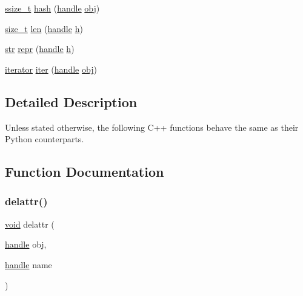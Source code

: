 \begin{DoxyCompactItemize}
\item 
\mbox{\hyperlink{detail_2common_8h_ac430d16fc097b3bf0a7469cfd09decda}{ssize\+\_\+t}} \mbox{\hyperlink{group__python__builtins_ga117a7eab72791313448c40a2f25f3582}{hash}} (\mbox{\hyperlink{classhandle}{handle}} \mbox{\hyperlink{_s_d_l__opengl__glext_8h_a0c0d4701a6c89f4f7f0640715d27ab26}{obj}})
\item 
\mbox{\hyperlink{detail_2common_8h_a801d6a451a01953ef8cbae6feb6a3638}{size\+\_\+t}} \mbox{\hyperlink{group__python__builtins_gaeff368081ac50b8fe2cc0230d96e3acb}{len}} (\mbox{\hyperlink{classhandle}{handle}} \mbox{\hyperlink{_s_d_l__opengl__glext_8h_afa0fb1b5e976920c0abeff2dca3ed774}{h}})
\item 
\mbox{\hyperlink{classstr}{str}} \mbox{\hyperlink{group__python__builtins_ga7118ad0f420ebd4a3aa3debbc834e7d7}{repr}} (\mbox{\hyperlink{classhandle}{handle}} \mbox{\hyperlink{_s_d_l__opengl__glext_8h_afa0fb1b5e976920c0abeff2dca3ed774}{h}})
\item 
\mbox{\hyperlink{classiterator}{iterator}} \mbox{\hyperlink{group__python__builtins_ga0f2342d8d9000a3bcef531c39e97c531}{iter}} (\mbox{\hyperlink{classhandle}{handle}} \mbox{\hyperlink{_s_d_l__opengl__glext_8h_a0c0d4701a6c89f4f7f0640715d27ab26}{obj}})
\end{DoxyCompactItemize}


\subsection{Detailed Description}
Unless stated otherwise, the following C++ functions behave the same as their Python counterparts. 

\subsection{Function Documentation}
\mbox{\label{group__python__builtins_ga74473a4403c91a8862e2b384245cb628}} 
\subsubsection{\texorpdfstring{delattr()}{delattr()}\hspace{0.1cm}{\footnotesize\ttfamily [1/2]}}
{\footnotesize\ttfamily \mbox{\hyperlink{_s_d_l__opengles2__gl2ext_8h_ae5d8fa23ad07c48bb609509eae494c95}{void}} delattr (\begin{DoxyParamCaption}\item[{\mbox{\hyperlink{classhandle}{handle}}}]{obj,  }\item[{\mbox{\hyperlink{classhandle}{handle}}}]{name }\end{DoxyParamCaption})\hspace{0.3cm}{\ttfamily [inline]}}

